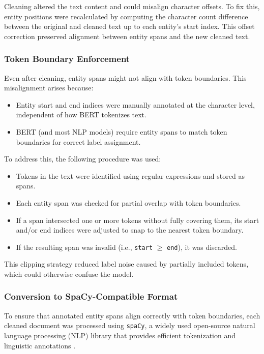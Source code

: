 \documentclass{article}
\begin{document}
Cleaning altered the text content and could misalign character offsets. To fix this, entity positions were recalculated by computing the character count difference between the original and cleaned text up to each entity's start index. This offset correction preserved alignment between entity spans and the new cleaned text.

\subsubsection{Token Boundary Enforcement}

Even after cleaning, entity spans might not align with token boundaries. This misalignment arises because:
\begin{itemize}
    \item Entity start and end indices were manually annotated at the character level, independent of how BERT tokenizes text.
    \item BERT (and most NLP models) require entity spans to match token boundaries for correct label assignment.
\end{itemize}

To address this, the following procedure was used:
\begin{itemize}
    \item Tokens in the text were identified using regular expressions and stored as spans.
    \item Each entity span was checked for partial overlap with token boundaries.
    \item If a span intersected one or more tokens without fully covering them, its start and/or end indices were adjusted to snap to the nearest token boundary.
    \item If the resulting span was invalid (i.e., \texttt{start} $\geq$ \texttt{end}), it was discarded.
\end{itemize}

This clipping strategy reduced label noise caused by partially included tokens, which could otherwise confuse the model.

\subsubsection{Conversion to SpaCy-Compatible Format}

To ensure that annotated entity spans align correctly with token boundaries, each cleaned document was processed using \texttt{spaCy}, a widely used open-source natural language processing (NLP) library that provides efficient tokenization and linguistic annotations \cite{spacy}. \\
\end{document}
